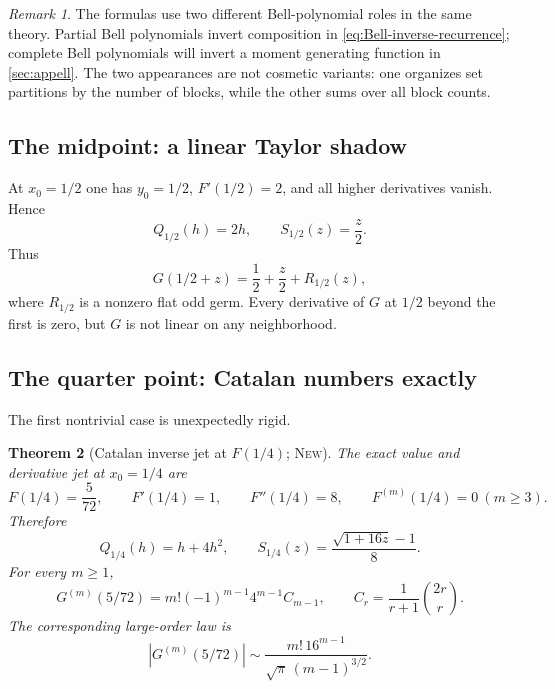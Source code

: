 \documentclass[11pt,oneside]{article}
\theoremstyle{frontier}
\newtheorem{theorem}{Theorem}[section]
\theoremstyle{definition}
\theoremstyle{remark}
\newtheorem{remark}[theorem]{Remark}
\newcommand{\InvF}{G}
\newcommand{\statusnew}{\textsc{New}}
\begin{document}
\begin{remark}
The formulas use two different Bell-polynomial roles in the same theory.  Partial Bell polynomials
invert composition in \eqref{eq:Bell-inverse-recurrence}; complete Bell polynomials will invert a
moment generating function in \cref{sec:appell}.  The two appearances are not cosmetic variants:
one organizes set partitions by the number of blocks, while the other sums over all block counts.
\end{remark}

\subsection{The midpoint: a linear Taylor shadow}

At $x_0=1/2$ one has $y_0=1/2$, $F'(1/2)=2$, and all higher derivatives vanish.  Hence
\begin{equation}
 Q_{1/2}(h)=2h,
 \qquad
 S_{1/2}(z)=\frac z2.
 \label{eq:midpoint-shadow}
\end{equation}
Thus
\begin{equation}
 \InvF(1/2+z)=\frac12+\frac z2+R_{1/2}(z),
 \label{eq:midpoint-flat}
\end{equation}
where $R_{1/2}$ is a nonzero flat odd germ.  Every derivative of $\InvF$ at $1/2$ beyond the first is
zero, but $\InvF$ is not linear on any neighborhood.

\subsection{The quarter point: Catalan numbers exactly}

The first nontrivial case is unexpectedly rigid.

\begin{theorem}[Catalan inverse jet at $F(1/4)$; \statusnew]
\label{thm:Catalan-quarter}
The exact value and derivative jet at $x_0=1/4$ are
\begin{equation}
 F(1/4)=\frac5{72},
 \qquad F'(1/4)=1,
 \qquad F''(1/4)=8,
 \qquad F^{(m)}(1/4)=0\ (m\ge3).
 \label{eq:quarter-jet}
\end{equation}
Therefore
\begin{equation}
 Q_{1/4}(h)=h+4h^2,
 \qquad
 S_{1/4}(z)=\frac{\sqrt{1+16z}-1}{8}.
 \label{eq:quarter-shadow}
\end{equation}
For every $m\ge1$,
\begin{equation}
 \boxed{
 \InvF^{(m)}(5/72)
 =m!(-1)^{m-1}4^{m-1}C_{m-1},
 \qquad C_r=\frac1{r+1}\binom{2r}{r}.
 }
 \label{eq:Catalan-derivatives}
\end{equation}
The corresponding large-order law is
\begin{equation}
 \left|\InvF^{(m)}(5/72)\right|
 \sim \frac{m!\,16^{m-1}}{\sqrt\pi\,(m-1)^{3/2}}.
 \label{eq:Catalan-asymptotic}
\end{equation}
\end{theorem}
\end{document}
